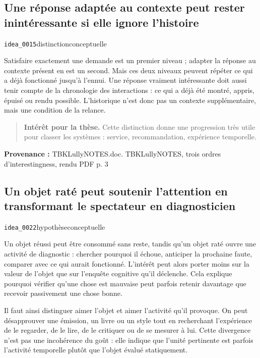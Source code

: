 \documentclass[10pt,a4paper]{article}
\begin{document}
\subsection{Une réponse adaptée au contexte peut rester inintéressante si elle ignore l'histoire}
{\small\color{metadata} \texttt{idea\_0015}\quad\textbullet\quad distinction\quad\textbullet\quad conceptuelle\par}

Satisfaire exactement une demande est un premier niveau ; adapter la réponse au contexte présent en est un second. Mais ces deux niveaux peuvent répéter ce qui a déjà fonctionné jusqu'à l'ennui. Une réponse vraiment intéressante doit aussi tenir compte de la chronologie des interactions : ce qui a déjà été montré, appris, épuisé ou rendu possible. L'historique n'est donc pas un contexte supplémentaire, mais une condition de la relance.

\begin{quote}
\textbf{Intérêt pour la thèse.} Cette distinction donne une progression très utile pour classer les systèmes : service, recommandation, expérience temporelle.
\end{quote}
{\footnotesize\color{metadata}\textbf{Provenance :} TBKLullyNOTES.doc. TBKLullyNOTES, trois ordres d'interestingness, rendu PDF p. 3\par}

\subsection{Un objet raté peut soutenir l'attention en transformant le spectateur en diagnosticien}
{\small\color{metadata} \texttt{idea\_0022}\quad\textbullet\quad hypothèse\quad\textbullet\quad conceptuelle\par}

Un objet réussi peut être consommé sans reste, tandis qu'un objet raté ouvre une activité de diagnostic : chercher pourquoi il échoue, anticiper la prochaine faute, comparer avec ce qui aurait fonctionné. L'intérêt peut alors porter moins sur la valeur de l'objet que sur l'enquête cognitive qu'il déclenche. Cela explique pourquoi vérifier qu'une chose est mauvaise peut parfois retenir davantage que recevoir passivement une chose bonne.

Il faut ainsi distinguer aimer l'objet et aimer l'activité qu'il provoque. On peut désapprouver une émission, un livre ou un style tout en recherchant l'expérience de le regarder, de le lire, de le critiquer ou de se mesurer à lui. Cette divergence n'est pas une incohérence du goût : elle indique que l'unité pertinente est parfois l'activité temporelle plutôt que l'objet évalué statiquement.
\end{document}
